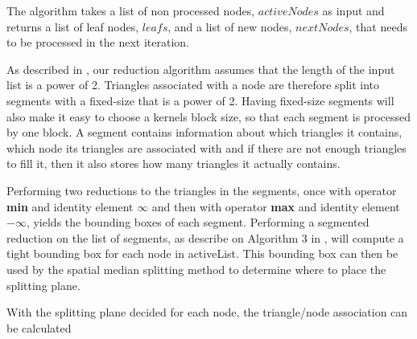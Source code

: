 \begin{algorithm}
\begin{algorithmic}
{                 \STATE{}

                   \ELSE
                   \ENDIF
                 \ENDFOR
  }
  \end{algorithmic}
\end{algorithm}


The algorithm takes a list of non processed nodes, $activeNodes$ as
input and returns a list of leaf nodes, $leafs$, and a list of new
nodes, $nextNodes$, that needs to be processed in the next iteration.


As described in , our reduction algorithm
assumes that the length of the input list is a power of 2. Triangles
associated with a node are therefore split into segments with a
fixed-size that is a power of 2. Having fixed-size segments will also
make it easy to choose a kernels block size, so that each segment is
processed by one block. A segment contains information about which
triangles it contains, which node its triangles are associated with
and if there are not enough triangles to fill it, then it also stores
how many triangles it actually contains.

Performing two reductions to the triangles in the segments, once with
operator \textbf{min} and identity element $\infty$ and then with
operator \textbf{max} and identity element $-\infty$, yields the
bounding boxes of each segment. Performing a segmented reduction on
the list of segments, as describe on Algorithm 3 in \zhou, will
compute a tight bounding box for each node in activeList. This
bounding box can then be used by the spatial median splitting method
to determine where to place the splitting plane.

With the splitting plane decided for each node, the triangle/node
association can be calculated




